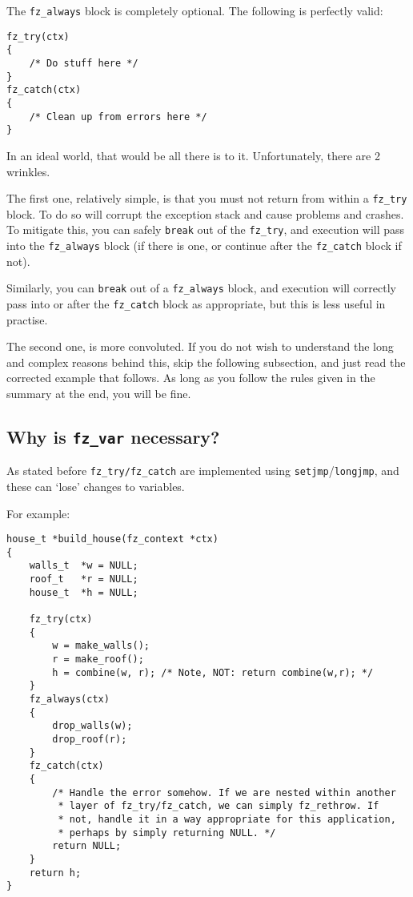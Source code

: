 \documentclass[oneside]{book}
\begin{document}
The \texttt{fz\_always} block is completely optional. The following is perfectly valid:

\begin{lstlisting}
fz_try(ctx)
{
    /* Do stuff here */
}
fz_catch(ctx)
{
    /* Clean up from errors here */
}
\end{lstlisting}

In an ideal world, that would be all there is to it. Unfortunately, there are 2 wrinkles.

The first one, relatively simple, is that you must not return from within a \texttt{fz\_try} block. To do so will corrupt the exception stack and cause problems and crashes. To mitigate this, you can safely \texttt{break} out of the \texttt{fz\_try}, and execution will pass into the \texttt{fz\_always} block (if there is one, or continue after the \texttt{fz\_catch} block if not).

Similarly, you can \texttt{break} out of a \texttt{fz\_always} block, and execution will correctly pass into or after the \texttt{fz\_catch} block as appropriate, but this is less useful in practise.

The second one, is more convoluted. If you do not wish to understand the long and complex reasons behind this, skip the following subsection, and just read the corrected example that follows. As long as you follow the rules given in the summary at the end, you will be fine.

\subsection{Why is \texttt{fz\_var} necessary?}

As stated before \texttt{fz\_try\slash}\texttt{fz\_catch} are implemented using \texttt{setjmp}\slash \texttt{longjmp}, and these can `lose' changes to variables.

For example:

\begin{lstlisting}
house_t *build_house(fz_context *ctx)
{
    walls_t  *w = NULL;
    roof_t   *r = NULL;
    house_t  *h = NULL;
    
    fz_try(ctx)
    {
        w = make_walls();
        r = make_roof();
        h = combine(w, r); /* Note, NOT: return combine(w,r); */
    }
    fz_always(ctx)
    {
        drop_walls(w);
        drop_roof(r);
    }
    fz_catch(ctx)
    {
        /* Handle the error somehow. If we are nested within another
         * layer of fz_try/fz_catch, we can simply fz_rethrow. If
         * not, handle it in a way appropriate for this application,
         * perhaps by simply returning NULL. */
        return NULL;
    }
    return h;
}
\end{lstlisting}
\end{document}
